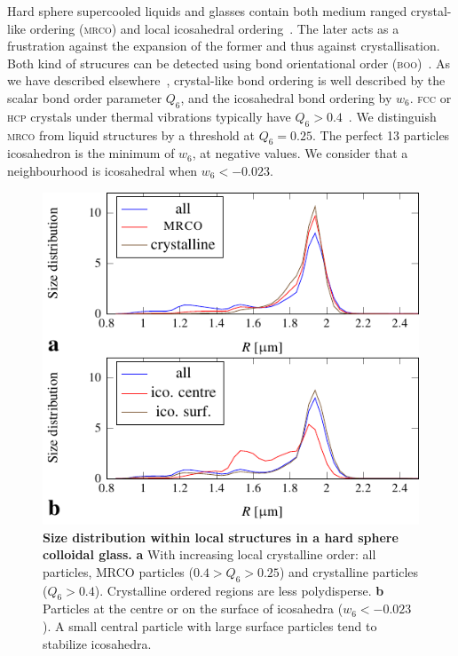 \documentclass[8.5pt,twoside,twocolumn]{article}
\begin{document}
Hard sphere supercooled liquids and glasses contain both medium ranged crystal-like ordering (\textsc{mrco}) and local icosahedral ordering~\cite{Leocmach2012}. The later acts as a frustration against the expansion of the former and thus against crystallisation. Both kind of strucures can be detected using bond orientational order (\textsc{boo})~\citet{steinhardt1983boo}. As we have described elsewhere~\cite{Leocmach2012}, crystal-like bond ordering is well described by the scalar bond order parameter $Q_6$, and the icosahedral bond ordering by $w_6$. \textsc{fcc} or \textsc{hcp} crystals under thermal vibrations typically have $Q_6>0.4$~\cite{Lechner2008}. We distinguish \textsc{mrco} from liquid structures by a threshold at $Q_6=0.25$. The perfect 13 particles icosahedron is the minimum of $w_6$, at negative values. We consider that a neighbourhood is icosahedral when $w_6<-0.023$.

\begin{figure}
	\centering
	\includegraphics{fig_size_struc.pdf}
	\caption{\textbf{Size distribution within local structures in a hard sphere colloidal glass.} \textbf{a} With increasing local crystalline order: all particles, MRCO particles ($0.4>Q_6>0.25$) and crystalline particles ($Q_6>0.4$). Crystalline ordered regions are less polydisperse. \textbf{b} Particles at the centre or on the surface of icosahedra ($w_6<-0.023$). A small central particle with large surface particles tend to stabilize icosahedra.}
	\label{fig:size_struc}
\end{figure}
\end{document}

